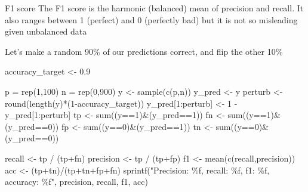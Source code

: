 \documentclass[
  10pt,
  ignorenonframetext,
  aspectratio=169]{beamer}
\newenvironment{Shaded}{\begin{snugshade}}{\end{snugshade}}
\newcommand{\DecValTok}[1]{\textcolor[rgb]{0.86,0.86,0.80}{#1}}
\newcommand{\FloatTok}[1]{\textcolor[rgb]{0.75,0.75,0.82}{#1}}
\newcommand{\FunctionTok}[1]{\textcolor[rgb]{0.94,0.94,0.56}{#1}}
\newcommand{\NormalTok}[1]{\textcolor[rgb]{0.80,0.80,0.80}{#1}}
\newcommand{\OtherTok}[1]{\textcolor[rgb]{0.94,0.94,0.56}{#1}}
\newcommand{\SpecialCharTok}[1]{\textcolor[rgb]{0.86,0.64,0.64}{#1}}
\newcommand{\StringTok}[1]{\textcolor[rgb]{0.80,0.58,0.58}{#1}}
\begin{document}
\begin{frame}[fragile]{F1 score}
\protect\hypertarget{f1-score}{}
The F1 score is the harmonic (balanced) mean of precision and recall. It
also ranges between 1 (perfect) and 0 (perfectly bad) but it is not so
misleading given unbalanced data

\medskip

Let's make a random 90\% of our predictions correct, and flip the other
10\%

\medskip

\scriptsize

\begin{Shaded}
\begin{Highlighting}[]
\NormalTok{accuracy\_target }\OtherTok{\textless{}{-}} \FloatTok{0.9}

\NormalTok{p }\OtherTok{=} \FunctionTok{rep}\NormalTok{(}\DecValTok{1}\NormalTok{,}\DecValTok{100}\NormalTok{)}
\NormalTok{n }\OtherTok{=} \FunctionTok{rep}\NormalTok{(}\DecValTok{0}\NormalTok{,}\DecValTok{900}\NormalTok{)}
\NormalTok{y }\OtherTok{\textless{}{-}} \FunctionTok{sample}\NormalTok{(}\FunctionTok{c}\NormalTok{(p,n))}
\NormalTok{y\_pred }\OtherTok{\textless{}{-}}\NormalTok{ y}
\NormalTok{perturb }\OtherTok{\textless{}{-}} \FunctionTok{round}\NormalTok{(}\FunctionTok{length}\NormalTok{(y)}\SpecialCharTok{*}\NormalTok{(}\DecValTok{1}\SpecialCharTok{{-}}\NormalTok{accuracy\_target))}
\NormalTok{y\_pred[}\DecValTok{1}\SpecialCharTok{:}\NormalTok{perturb] }\OtherTok{\textless{}{-}} \DecValTok{1} \SpecialCharTok{{-}}\NormalTok{ y\_pred[}\DecValTok{1}\SpecialCharTok{:}\NormalTok{perturb]}
\NormalTok{tp }\OtherTok{\textless{}{-}} \FunctionTok{sum}\NormalTok{((y}\SpecialCharTok{==}\DecValTok{1}\NormalTok{)}\SpecialCharTok{\&}\NormalTok{(y\_pred}\SpecialCharTok{==}\DecValTok{1}\NormalTok{))}
\NormalTok{fn }\OtherTok{\textless{}{-}} \FunctionTok{sum}\NormalTok{((y}\SpecialCharTok{==}\DecValTok{1}\NormalTok{)}\SpecialCharTok{\&}\NormalTok{(y\_pred}\SpecialCharTok{==}\DecValTok{0}\NormalTok{))}
\NormalTok{fp }\OtherTok{\textless{}{-}} \FunctionTok{sum}\NormalTok{((y}\SpecialCharTok{==}\DecValTok{0}\NormalTok{)}\SpecialCharTok{\&}\NormalTok{(y\_pred}\SpecialCharTok{==}\DecValTok{1}\NormalTok{))}
\NormalTok{tn }\OtherTok{\textless{}{-}} \FunctionTok{sum}\NormalTok{((y}\SpecialCharTok{==}\DecValTok{0}\NormalTok{)}\SpecialCharTok{\&}\NormalTok{(y\_pred}\SpecialCharTok{==}\DecValTok{0}\NormalTok{))}

\NormalTok{recall }\OtherTok{\textless{}{-}}\NormalTok{ tp }\SpecialCharTok{/}\NormalTok{ (tp}\SpecialCharTok{+}\NormalTok{fn)}
\NormalTok{precision }\OtherTok{\textless{}{-}}\NormalTok{ tp }\SpecialCharTok{/}\NormalTok{ (tp}\SpecialCharTok{+}\NormalTok{fp)}
\NormalTok{f1 }\OtherTok{\textless{}{-}} \FunctionTok{mean}\NormalTok{(}\FunctionTok{c}\NormalTok{(recall,precision))}
\NormalTok{acc }\OtherTok{\textless{}{-}}\NormalTok{ (tp}\SpecialCharTok{+}\NormalTok{tn)}\SpecialCharTok{/}\NormalTok{(tp}\SpecialCharTok{+}\NormalTok{tn}\SpecialCharTok{+}\NormalTok{fp}\SpecialCharTok{+}\NormalTok{fn)}
\FunctionTok{sprintf}\NormalTok{(}\StringTok{"Precision: \%f, recall: \%f, f1: \%f, accuracy: \%f"}\NormalTok{, precision, recall, f1, acc)}
\end{Highlighting}
\end{Shaded}


\end{frame}
\end{document}
